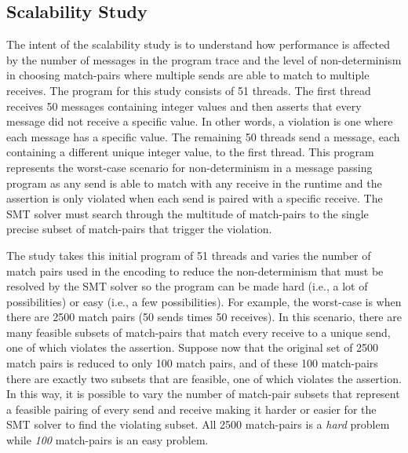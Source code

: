 \subsection{Scalability Study}

The intent of the scalability study is to understand how performance is affected by the number of messages in the program trace and the level of non-determinism in choosing match-pairs where multiple sends are able to match to multiple receives. The program for this study consists of 51 threads. The first thread receives 50 messages containing integer values and then asserts that every message did not receive a specific value. In other words, a violation is one where each message has a specific value.  The remaining 50 threads send a message, each containing a different unique integer value, to the first thread. This program represents the worst-case scenario for non-determinism in a message passing program as any send is able to match with any receive in the runtime and the assertion is only violated when each send is paired with a specific receive. The SMT solver must search through the multitude of match-pairs to the single precise subset of match-pairs that trigger the violation.

The study takes this initial program of 51 threads and varies the number of match pairs used in the encoding to reduce the non-determinism that must be resolved by the SMT solver so the program can be made hard (i.e., a lot of possibilities) or easy (i.e., a few possibilities). For example, the worst-case is when there are 2500 match pairs (50 sends times 50 receives). In this scenario, there are many feasible subsets of match-pairs that match every receive to a unique send, one of which violates the assertion. Suppose now that the original set of 2500 match pairs is reduced to only 100 match pairs, and of these 100 match-pairs there are exactly two subsets that are feasible, one of which violates the assertion. In this way, it is possible to vary the number of match-pair subsets that represent a feasible pairing of every send and receive making it harder or easier for the SMT solver to find the violating subset. All 2500 match-pairs is a \emph{hard} problem while \emph{100} match-pairs is an easy problem.


